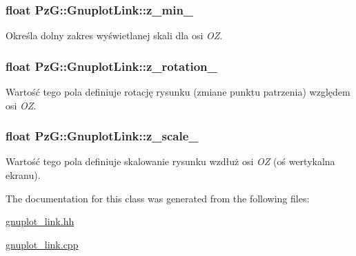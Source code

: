 \subsubsection[{\texorpdfstring{z\+\_\+min\+\_\+}{z_min_}}]{\setlength{\rightskip}{0pt plus 5cm}float Pz\+G\+::\+Gnuplot\+Link\+::z\+\_\+min\+\_\+\hspace{0.3cm}{\ttfamily [protected]}}\hypertarget{class_pz_g_1_1_gnuplot_link_a3a92421a06513241d150ec36eedcfb70}{}\label{class_pz_g_1_1_gnuplot_link_a3a92421a06513241d150ec36eedcfb70}
Określa dolny zakres wyświetlanej skali dla osi {\itshape OZ}. 
\subsubsection[{\texorpdfstring{z\+\_\+rotation\+\_\+}{z_rotation_}}]{\setlength{\rightskip}{0pt plus 5cm}float Pz\+G\+::\+Gnuplot\+Link\+::z\+\_\+rotation\+\_\+\hspace{0.3cm}{\ttfamily [protected]}}\hypertarget{class_pz_g_1_1_gnuplot_link_ae7ae9a0985b545d636908deb232f716c}{}\label{class_pz_g_1_1_gnuplot_link_ae7ae9a0985b545d636908deb232f716c}
Wartość tego pola definiuje rotację rysunku (zmiane punktu patrzenia) względem osi {\itshape OZ}. 
\subsubsection[{\texorpdfstring{z\+\_\+scale\+\_\+}{z_scale_}}]{\setlength{\rightskip}{0pt plus 5cm}float Pz\+G\+::\+Gnuplot\+Link\+::z\+\_\+scale\+\_\+\hspace{0.3cm}{\ttfamily [protected]}}\hypertarget{class_pz_g_1_1_gnuplot_link_a9926edcec6c7080a35f62c050f2773dc}{}\label{class_pz_g_1_1_gnuplot_link_a9926edcec6c7080a35f62c050f2773dc}
Wartość tego pola definiuje skalowanie rysunku wzdłuż osi {\itshape OZ} (oś wertykalna ekranu). 

The documentation for this class was generated from the following files\+:\begin{DoxyCompactItemize}
\item 
\hyperlink{gnuplot__link_8hh}{gnuplot\+\_\+link.\+hh}\item 
\hyperlink{gnuplot__link_8cpp}{gnuplot\+\_\+link.\+cpp}\end{DoxyCompactItemize}
